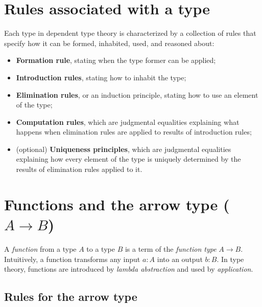 \documentclass{article}
\newcommand{\inl}{\mathsf{inl}}
\newcommand{\inr}{\mathsf{inr}}
\begin{document}

\section{Rules associated with a type}

Each type in dependent type theory is characterized by a collection of rules that specify how it can be formed, inhabited, used, and reasoned about:

\begin{itemize}
  \item \textbf{Formation rule}, stating when the type former can be applied;
  \item \textbf{Introduction rules}, stating how to inhabit the type;
  \item \textbf{Elimination rules}, or an induction principle, stating how to use an element of the type;
  \item \textbf{Computation rules}, which are judgmental equalities explaining what happens when elimination rules are applied to results of introduction rules;
  \item (optional) \textbf{Uniqueness principles}, which are judgmental equalities explaining how every element of the type is uniquely determined by the results of elimination rules applied to it.
\end{itemize}

\section{Functions and the arrow type \texorpdfstring{(\(A \to B\))}{(A -> B)}}

A \emph{function} from a type \(A\) to a type \(B\) is a term of the
\emph{function type} \(A \to B\). Intuitively, a function transforms any input \(a:A\)
into an output \(b:B\). In type theory, functions are introduced by
\emph{lambda abstraction} and used by \emph{application}.

\subsection*{Rules for the arrow type}
\end{document}
